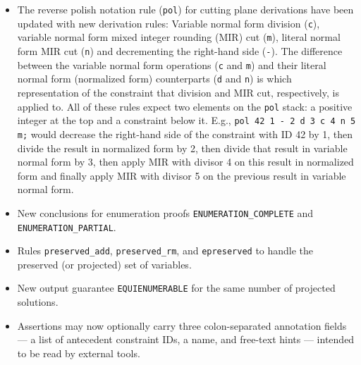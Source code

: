 \documentclass[a4paper]{article}
\begin{document}
\begin{itemize}
	\item The reverse polish notation rule (\lstinline[language=veripb]!pol!) for cutting plane derivations have been updated with new derivation rules: Variable normal form division (\lstinline[language=veripb]!c!), variable normal form mixed integer rounding (MIR) cut (\lstinline[language=veripb]!m!), literal normal form MIR cut (\lstinline[language=veripb]!n!) and decrementing the right-hand side (\lstinline[language=veripb]!-!). The difference between the variable normal form operations (\lstinline[language=veripb]!c! and \lstinline[language=veripb]!m!) and their literal normal form (normalized form) counterparts (\lstinline[language=veripb]!d! and \lstinline[language=veripb]!n!) is which representation of the constraint that division and MIR cut, respectively, is applied to. All of these rules expect two elements on the \lstinline[language=veripb]!pol! stack: a positive integer at the top and a constraint below it. E.g., \lstinline[language=veripb]!pol 42 1 - 2 d 3 c 4 n 5 m;! would decrease the right-hand side of the constraint with ID 42 by 1, then divide the result in normalized form by 2, then divide that result in variable normal form by 3, then apply MIR with divisor 4 on this result in normalized form and finally apply MIR with divisor 5 on the previous result in variable normal form.
	\item New conclusions for enumeration proofs \lstinline[language=veripb]!ENUMERATION_COMPLETE! and \lstinline[language=veripb]!ENUMERATION_PARTIAL!.
	\item Rules \lstinline[language=veripb]!preserved_add!, \lstinline[language=veripb]!preserved_rm!, and \lstinline[language=veripb]!epreserved! to handle the preserved (or projected) set of variables.
	\item New output guarantee \lstinline[language=veripb]!EQUIENUMERABLE! for the same number of projected solutions.
	\item Assertions may now optionally carry three colon-separated annotation fields — a list
of antecedent constraint IDs, a name, and free-text hints — intended to be read by external tools.
\end{itemize}
\end{document}
